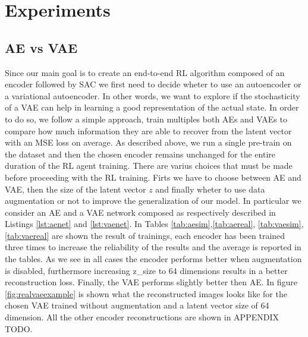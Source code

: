\chapter{Experiments}

\section{AE vs VAE}

Since our main goal is to create an end-to-end RL algorithm composed of an encoder followed by SAC we first need to decide wheter to use an autoencoder or a variational autoencoder. In other words, we want to explore if the stochasticity of a VAE can help in learning a good representation of the actual state. In order to do so, we follow a simple approach, train multiples both AEs and VAEs to compare how much information they are able to recover from the latent vector with an MSE loss on average. As described above, we run a single pre-train on the dataset and then the chosen encoder remains unchanged for the entire duration of the RL agent training. There are varius choices that must be made before proceeding with the RL training. Firts we have to choose between AE and VAE, then the size of the latent vector $z$ and finally wheter to use data augmentation or not to improve the generalization of our model. In particular we consider an AE and a VAE network composed as respectively described in Listings \ref{lst:aenet} and \ref{lst:vaenet}. In Tables \ref{tab:aesim},\ref{tab:aereal}, \ref{tab:vaesim},\ref{tab:vaereal} are shown the result of trainings, each encoder has been trained three times to increase the reliability of the results and the average is reported in the tables. As we see in all cases the encoder performs better when augmentation is disabled, furthermore increasing z\_size to 64 dimensions results in a better reconstruction loss. Finally, the VAE performs slightly better then AE. In figure \ref{fig:realvaeexample} is shown what the reconstructed images looks like for the chosen VAE trained without augmentation and a latent vector size of 64 dimension. All the other encoder reconstructions are shown in APPENDIX TODO.

